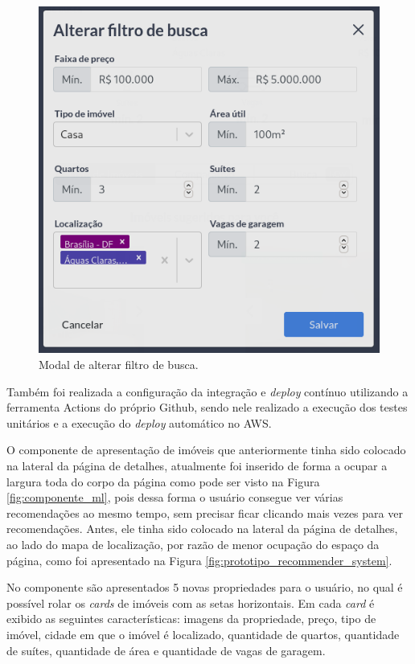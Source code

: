\begin{figure}[H]
    \centering
    \includegraphics[scale=0.45]{figuras/desenvolvimento/componente_busca.png}
    \caption[Modal de alterar filtro de busca]{Modal de alterar filtro de busca.}
    \label{fig:componente_busca}
\end{figure}

Também foi realizada a configuração da integração e \textit{deploy} contínuo utilizando a ferramenta Actions do próprio Github, sendo nele realizado a execução dos testes unitários e a execução do \textit{deploy} automático no AWS.

O componente de apresentação de imóveis que anteriormente tinha sido colocado na lateral da página de detalhes, atualmente foi inserido de forma a ocupar a largura toda do corpo da página como pode ser visto na Figura \ref{fig:componente_ml}, pois dessa forma o usuário consegue ver várias recomendações ao mesmo tempo, sem precisar ficar clicando mais vezes para ver recomendações. Antes, ele tinha sido colocado na lateral da página de detalhes, ao lado do mapa de localização, por razão de menor ocupação do espaço da página, como foi apresentado na Figura \ref{fig:prototipo_recommender_system}.

No componente são apresentados 5 novas propriedades para o usuário, no qual é possível rolar os \textit{cards} de imóveis com as setas horizontais. Em cada \textit{card} é exibido as seguintes características: imagens da propriedade, preço, tipo de imóvel, cidade em que o imóvel é localizado, quantidade de quartos, quantidade de suítes, quantidade de área e quantidade de vagas de garagem.

